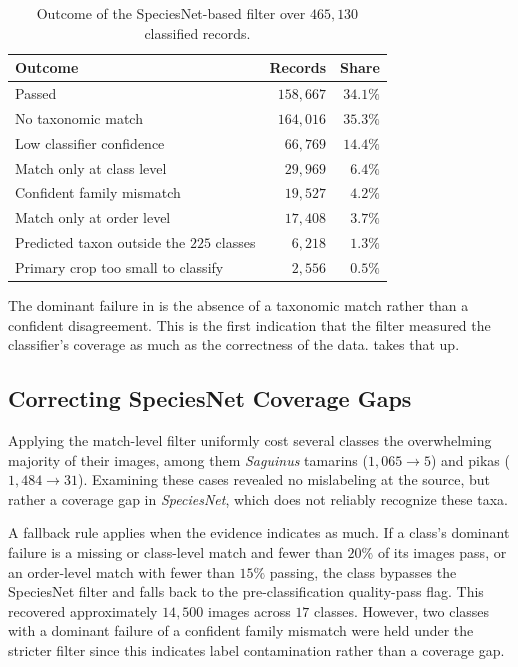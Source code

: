 \begin{table}[htbp]
\centering
\caption{Outcome of the SpeciesNet-based filter over $465{,}130$ classified records.}
\label{tab:speciesnet-filter-attrition}
\begin{tabular}{@{}lrr@{}}
\toprule
Outcome & Records & Share \\
\midrule
Passed & $158{,}667$ & $34.1\%$ \\
\midrule
No taxonomic match & $164{,}016$ & $35.3\%$ \\
Low classifier confidence & $66{,}769$ & $14.4\%$ \\
Match only at class level & $29{,}969$ & $6.4\%$ \\
Confident family mismatch & $19{,}527$ & $4.2\%$ \\
Match only at order level & $17{,}408$ & $3.7\%$ \\
Predicted taxon outside the $225$ classes & $6{,}218$ & $1.3\%$ \\
Primary crop too small to classify & $2{,}556$ & $0.5\%$ \\
\bottomrule
\end{tabular}
\end{table}

The dominant failure in  is the absence of a taxonomic match rather than a confident disagreement. This is the first indication that the filter measured the classifier's coverage as much as the correctness of the data.  takes that up.

\subsection{Correcting SpeciesNet Coverage Gaps}\label{sec:speciesnet_coverage_gaps}

Applying the match-level filter uniformly cost several classes the overwhelming majority of their images, among them \textit{Saguinus} tamarins ($1{,}065 \rightarrow 5$) and pikas ($1{,}484 \rightarrow 31$). Examining these cases revealed no mislabeling at the source, but rather a coverage gap in \textit{SpeciesNet}, which does not reliably recognize these taxa.

A fallback rule applies when the evidence indicates as much. If a class's dominant failure is a missing or class-level match and fewer than $20\%$ of its images pass, or an order-level match with fewer than $15\%$ passing, the class bypasses the SpeciesNet filter and falls back to the pre-classification quality-pass flag. This recovered approximately $14{,}500$ images across $17$ classes. However, two classes with a dominant failure of a confident family mismatch were held under the stricter filter since this indicates label contamination rather than a coverage gap.

